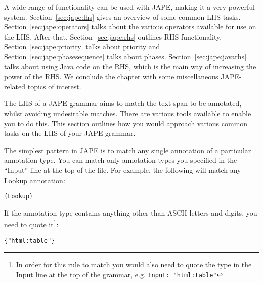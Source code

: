 A wide range of functionality can be used with JAPE, making it a very powerful
system. Section~\ref{sec:jape:lhs} gives an overview of some common LHS tasks.
Section~\ref{sec:jape:operators} talks about the various operators available for
use on the LHS. After that, Section~\ref{sec:jape:rhs} outlines RHS
functionality. Section~\ref{sec:jape:priority} talks about priority and
Section~\ref{sec:jape:phasesequence} talks about phases.
Section~\ref{sec:jape:javarhs} talks about using Java code on the RHS, which is
the main way of increasing the power of the RHS. We conclude the chapter with
some miscellaneous JAPE-related topics of interest.


The LHS of a JAPE grammar aims to match the text span to be annotated, whilst
avoiding undesirable matches. There are various tools available to enable you
to do this. This section outlines how you would approach various common tasks
on the LHS of your JAPE grammar.


The simplest pattern in JAPE is to match any single annotation of a particular
annotation type.  You can match only annotation types you specified in the
``Input'' line at the top of the file.  For example, the following will match
any Lookup annotation:

\begin{small}
\begin{verbatim}
{Lookup}
\end{verbatim}
\end{small}

If the annotation type contains anything other than ASCII letters and digits,
you need to quote it\footnote{In order for this rule to match you would also
need to quote the type in the Input line at the top of the grammar, e.g.
\texttt{Input: "html:table"}}:

\begin{small}
\begin{verbatim}
{"html:table"}
\end{verbatim}
\end{small}



